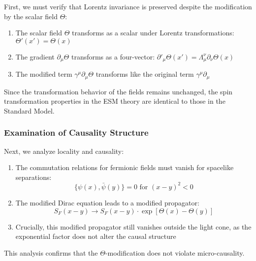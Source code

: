 \documentclass[12pt,a4paper]{article}
\begin{document}
	First, we must verify that Lorentz invariance is preserved despite the modification by the scalar field $\Theta$:
	
	\begin{enumerate}
		\item The scalar field $\Theta$ transforms as a scalar under Lorentz transformations: $\Theta'(x') = \Theta(x)$
		\item The gradient $\partial_{\mu}\Theta$ transforms as a four-vector: $\partial'_{\mu}\Theta(x') = \Lambda^{\nu}_{\mu} \partial_{\nu}\Theta(x)$
		\item The modified term $\gamma^{\mu}\partial_{\mu}\Theta$ transforms like the original term $\gamma^{\mu}\partial_{\mu}$
	\end{enumerate}
	
	Since the transformation behavior of the fields remains unchanged, the spin transformation properties in the ESM theory are identical to those in the Standard Model.
	
	\subsubsection{Examination of Causality Structure}
	\label{subsubsec:causality_examination}
	
	Next, we analyze locality and causality:
	
	\begin{enumerate}
		\item The commutation relations for fermionic fields must vanish for spacelike separations:
		\begin{equation}
			\{\psi(x), \bar{\psi}(y)\} = 0 \text{ for } (x-y)^2 < 0
			\label{eq:fermion_commutation}
		\end{equation}
		
		\item The modified Dirac equation leads to a modified propagator:
		\begin{equation}
			S_F(x-y) \rightarrow S_F(x-y) \cdot \exp[\Theta(x) - \Theta(y)]
			\label{eq:modified_propagator}
		\end{equation}
		
		\item Crucially, this modified propagator still vanishes outside the light cone, as the exponential factor does not alter the causal structure
	\end{enumerate}
	
	This analysis confirms that the $\Theta$-modification does not violate micro-causality.
	
\end{document}
